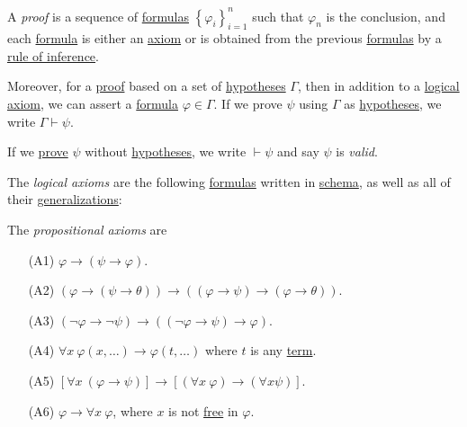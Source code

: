 \begin{definition}[Proof]\label{def:proof}
	A \emph{proof} is a sequence of \hyperref[def:formula]{formulas} \(\left\{ \varphi _i \right\} _{i=1}^n\) such that \(\varphi _n\) is the conclusion, and each \hyperref[def:formula]{formula} is either an \hyperref[def:logical-axioms]{axiom} or is obtained from the previous \hyperref[def:formula]{formulas} by a \hyperref[def:rule-of-inference]{rule of inference}.

	Moreover, for a \hyperref[def:proof]{proof} based on a set of \hyperref[not:hypothesis]{hypotheses} \(\Gamma \), then in addition to a \hyperref[def:logical-axioms]{logical axiom}, we can assert a \hyperref[def:formula]{formula} \(\varphi \in \Gamma \). If we prove \(\psi \) using \(\Gamma \) as \hyperref[not:hypothesis]{hypotheses}, we write \(\Gamma \vdash \psi \).

	\begin{definition}[Valid]\label{def:valid}
		If we \hyperref[def:proof]{prove} \(\psi \) without \hyperref[not:hypothesis]{hypotheses}, we write \(\vdash \psi \) and say \(\psi \) is \emph{valid}.
	\end{definition}

	\begin{definition}\label{def:logical-axioms}
		The \emph{logical axioms} are the following \hyperref[def:formula]{formulas} written in \hyperref[not:schema]{schema}, as well as all of their \hyperref[def:generalization]{generalizations}:
		\begin{definition}\label{def:propositional-axioms}
			The \emph{propositional axioms} are
			\begin{enumerate}
				\item[(A1)] \(\varphi \to  (\psi \to \varphi )\).
				\item[(A2)] \((\varphi \to (\psi \to \theta )) \to ((\varphi \to  \psi ) \to (\varphi \to \theta ))\).
				\item[(A3)] \((\lnot \varphi \to \lnot \psi ) \to  ((\lnot \varphi \to \psi ) \to \varphi )\).
			\end{enumerate}
		\end{definition}

		\begin{enumerate}
			\item[(A4)] \(\forall x\ \varphi (x, \ldots ) \to \varphi (t, \ldots )\) where \(t\) is any \hyperref[def:term]{term}.
			\item[(A5)] \(\left[ \forall x\ (\varphi \to \psi ) \right] \to \left[ (\forall x\ \varphi ) \to (\forall x \psi ) \right] \).
			\item[(A6)] \(\varphi \to  \forall x\ \varphi \), where \(x\) is not \hyperref[def:free-variable]{free} in \(\varphi \).
		\end{enumerate}


\end{definition}
\end{definition}
